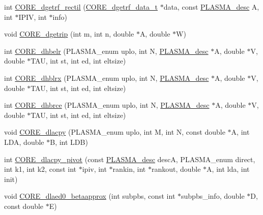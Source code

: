 \begin{DoxyCompactItemize}
\item 
int \hyperlink{group__CORE__double_gab19afc12efaf81167776221dcc3e4095_gab19afc12efaf81167776221dcc3e4095}{C\+O\+R\+E\+\_\+dgetrf\+\_\+rectil} (\hyperlink{structCORE__dgetrf__data__s}{C\+O\+R\+E\+\_\+dgetrf\+\_\+data\+\_\+t} $\ast$data, const \hyperlink{structplasma__desc__t}{P\+L\+A\+S\+M\+A\+\_\+desc} A, int $\ast$I\+P\+I\+V, int $\ast$info)
\item 
void \hyperlink{group__CORE__double_gaef525bd155bb8cccbcb8055a8ac19170_gaef525bd155bb8cccbcb8055a8ac19170}{C\+O\+R\+E\+\_\+dgetrip} (int m, int n, double $\ast$A, double $\ast$W)
\item 
int \hyperlink{group__CORE__double_gadb56425edd66af0d0baaafa4db730687_gadb56425edd66af0d0baaafa4db730687}{C\+O\+R\+E\+\_\+dhbelr} (P\+L\+A\+S\+M\+A\+\_\+enum uplo, int N, \hyperlink{structplasma__desc__t}{P\+L\+A\+S\+M\+A\+\_\+desc} $\ast$A, double $\ast$V, double $\ast$T\+A\+U, int st, int ed, int eltsize)
\item 
int \hyperlink{group__CORE__double_ga6b181b2a5e76222ea33f2bb6cf02419e_ga6b181b2a5e76222ea33f2bb6cf02419e}{C\+O\+R\+E\+\_\+dhblrx} (P\+L\+A\+S\+M\+A\+\_\+enum uplo, int N, \hyperlink{structplasma__desc__t}{P\+L\+A\+S\+M\+A\+\_\+desc} $\ast$A, double $\ast$V, double $\ast$T\+A\+U, int st, int ed, int eltsize)
\item 
int \hyperlink{group__CORE__double_gaeac6ec5ddb7fb26216c32ffae11a9d20_gaeac6ec5ddb7fb26216c32ffae11a9d20}{C\+O\+R\+E\+\_\+dhbrce} (P\+L\+A\+S\+M\+A\+\_\+enum uplo, int N, \hyperlink{structplasma__desc__t}{P\+L\+A\+S\+M\+A\+\_\+desc} $\ast$A, double $\ast$V, double $\ast$T\+A\+U, int st, int ed, int eltsize)
\item 
void \hyperlink{group__CORE__double_gabe6acc0e0cb39b2a16cb484ce527e19e_gabe6acc0e0cb39b2a16cb484ce527e19e}{C\+O\+R\+E\+\_\+dlacpy} (P\+L\+A\+S\+M\+A\+\_\+enum uplo, int M, int N, const double $\ast$A, int L\+D\+A, double $\ast$B, int L\+D\+B)
\item 
int \hyperlink{group__CORE__double_gaf9b1c36e5bd489b8e488243b076814f8_gaf9b1c36e5bd489b8e488243b076814f8}{C\+O\+R\+E\+\_\+dlacpy\+\_\+pivot} (const \hyperlink{structplasma__desc__t}{P\+L\+A\+S\+M\+A\+\_\+desc} desc\+A, P\+L\+A\+S\+M\+A\+\_\+enum direct, int k1, int k2, const int $\ast$ipiv, int $\ast$rankin, int $\ast$rankout, double $\ast$A, int lda, int init)
\item 
void \hyperlink{group__CORE__double_ga785e1bf88728ffb2b7339e9de433d0f2_ga785e1bf88728ffb2b7339e9de433d0f2}{C\+O\+R\+E\+\_\+dlaed0\+\_\+betaapprox} (int subpbs, const int $\ast$subpbs\+\_\+info, double $\ast$D, const double $\ast$E)

\end{DoxyCompactItemize}

